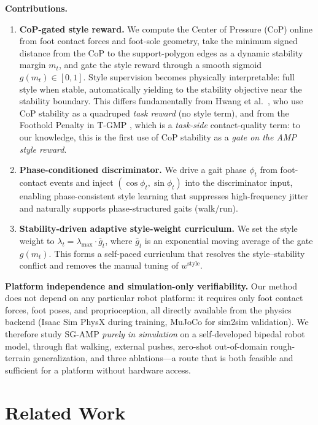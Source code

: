 \documentclass[conference]{IEEEtran}
\begin{document}
\noindent\textbf{Contributions.}
\begin{enumerate}
    \item \textbf{CoP-gated style reward.} We compute the Center of Pressure (CoP) online from foot contact forces and foot-sole geometry, take the minimum signed distance from the CoP to the support-polygon edges as a dynamic stability margin $m_t$, and gate the style reward through a smooth sigmoid $g(m_t)\in[0,1]$. Style supervision becomes physically interpretable: full style when stable, automatically yielding to the stability objective near the stability boundary. This differs fundamentally from Hwang et al.~\cite{hwang2026footposition}, who use CoP stability as a quadruped \emph{task reward} (no style term), and from the Foothold Penalty in T-GMP \cite{guo2026tgmp}, which is a \emph{task-side} contact-quality term: to our knowledge, this is the first use of CoP stability as a \emph{gate on the AMP style reward}.
    \item \textbf{Phase-conditioned discriminator.} We drive a gait phase $\phi_t$ from foot-contact events and inject $(\cos\phi_t,\sin\phi_t)$ into the discriminator input, enabling phase-consistent style learning that suppresses high-frequency jitter and naturally supports phase-structured gaits (walk/run).
    \item \textbf{Stability-driven adaptive style-weight curriculum.} We set the style weight to $\lambda_t=\lambda_{\max}\cdot\bar g_t$, where $\bar g_t$ is an exponential moving average of the gate $g(m_t)$. This forms a self-paced curriculum that resolves the style--stability conflict and removes the manual tuning of $w^{\mathrm{style}}$.
\end{enumerate}

\noindent\textbf{Platform independence and simulation-only verifiability.} Our method does not depend on any particular robot platform: it requires only foot contact forces, foot poses, and proprioception, all directly available from the physics backend (Isaac Sim PhysX during training, MuJoCo for sim2sim validation). We therefore study SG-AMP \emph{purely in simulation} on a self-developed bipedal robot model, through flat walking, external pushes, zero-shot out-of-domain rough-terrain generalization, and three ablations---a route that is both feasible and sufficient for a platform without hardware access.

\section{Related Work}
\label{sec:related_work}
\end{document}
